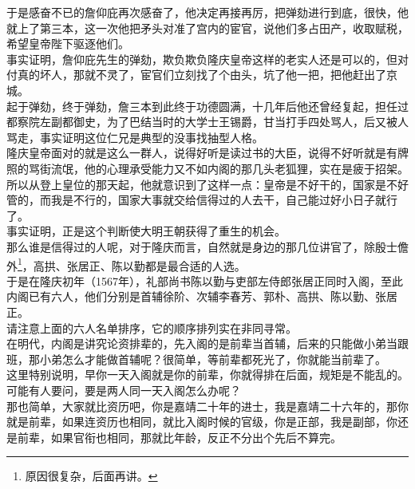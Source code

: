 \begin{multicols}{\theparacolNo}
于是感奋不已的詹仰庇再次感奋了，他决定再接再厉，把弹劾进行到底，很快，他就上了第三本，这一次他把矛头对准了宫内的宦官，说他们多占田产，收取赋税，希望皇帝陛下驱逐他们。\\

事实证明，詹仰庇先生的弹劾，欺负欺负隆庆皇帝这样的老实人还是可以的，但对付真的坏人，那就不灵了，宦官们立刻找了个由头，坑了他一把，把他赶出了京城。\\

起于弹劾，终于弹劾，詹三本到此终于功德圆满，十几年后他还曾经复起，担任过都察院左副都御史，为了巴结当时的大学士王锡爵，甘当打手四处骂人，后又被人骂走，事实证明这位仁兄是典型的没事找抽型人格。\\

隆庆皇帝面对的就是这么一群人，说得好听是读过书的大臣，说得不好听就是有牌照的骂街流氓，他的心理承受能力又不如内阁的那几头老狐狸，实在是疲于招架。\\

所以从登上皇位的那天起，他就意识到了这样一点：皇帝是不好干的，国家是不好管的，而我是不行的，国家大事就交给信得过的人去干，自己能过好小日子就行了。\\

事实证明，正是这个判断使大明王朝获得了重生的机会。\\

那么谁是信得过的人呢，对于隆庆而言，自然就是身边的那几位讲官了，除殷士儋外\footnote{原因很复杂，后面再讲。}，高拱、张居正、陈以勤都是最合适的人选。\\

于是在隆庆初年（1567年），礼部尚书陈以勤与吏部左侍郎张居正同时入阁，至此内阁已有六人，他们分别是首辅徐阶、次辅李春芳、郭朴、高拱、陈以勤、张居正。\\

请注意上面的六人名单排序，它的顺序排列实在非同寻常。\\

在明代，内阁是讲究论资排辈的，先入阁的是前辈当首辅，后来的只能做小弟当跟班，那小弟怎么才能做首辅呢？很简单，等前辈都死光了，你就能当前辈了。\\

这里特别说明，早你一天入阁就是你的前辈，你就得排在后面，规矩是不能乱的。可能有人要问，要是两人同一天入阁怎么办呢？\\

那也简单，大家就比资历吧，你是嘉靖二十年的进士，我是嘉靖二十六年的，那你就是前辈，如果连资历也相同，就比入阁时候的官级，你是正部，我是副部，你还是前辈，如果官衔也相同，那就比年龄，反正不分出个先后不算完。\\


\end{multicols}
